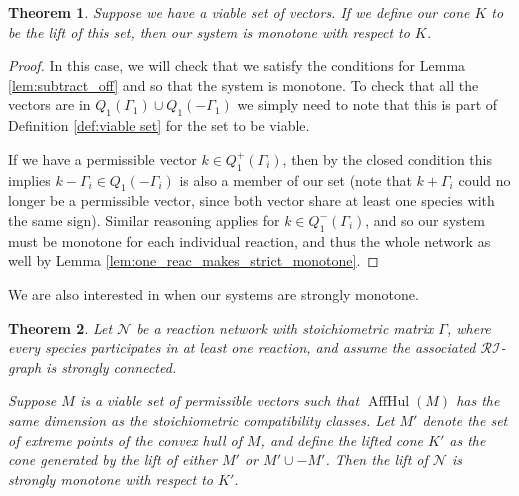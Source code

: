 \documentclass{article}
\newtheorem{thm}{Theorem}
\begin{document}
\begin{thm}
\label{thm:lift viable for monotone}
     Suppose we have a viable set of vectors. If we define our cone $K$ to be the lift of this set, then our system is monotone with respect to $K$. 
\end{thm}



\begin{proof}
    In this case, we will check that we satisfy the conditions for Lemma 
    \ref{lem:subtract_off} and so that the system is monotone. To check that all the vectors are in $Q_1(\Gamma_1) \cup Q_1(-\Gamma_1)$ we simply need to note that this is part of Definition \ref{def:viable set} for the set to be viable.

    If we have a permissible vector $k \in Q_1^+(\Gamma_i)$, then by the closed condition this implies $k - \Gamma_i \in Q_1(-\Gamma_i)$ is also a member of our set (note that $k + \Gamma_i$ could no longer be a permissible vector, since both vector share at least one species with the same sign). Similar reasoning applies for $k \in Q_1^-(\Gamma_i)$, and so our system must be monotone for each individual reaction, and thus the whole network as well by Lemma \ref{lem:one_reac_makes_strict_monotone}.

\end{proof}





We are also interested in when our systems are strongly monotone.  

\begin{thm}
\label{thm:output_M_to_strong_monotone}
Let $\mathcal{N}$ be a reaction network with stoichiometric matrix $\Gamma$, where every species participates in at least one reaction, and assume the associated $\mathcal{RI}$-graph is strongly connected.

Suppose $M$ is a viable set of permissible vectors such that $\operatorname{AffHul}(M)$ has the same dimension as the stoichiometric compatibility classes. Let $M'$ denote the set of extreme points of the convex hull of $M$, and define the lifted cone $K'$ as the cone generated by the lift of either $M'$ or $M' \cup -M'$. Then the lift of $\mathcal{N}$ is strongly monotone with respect to $K'$.
\end{thm}
\end{document}
